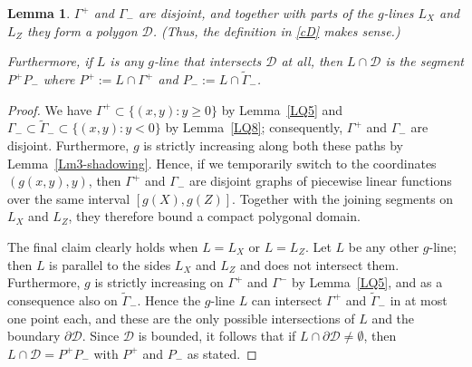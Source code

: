 \documentclass[11pt,reqno,tbtags,a4paper]{amsart}
\numberwithin{equation}{section}
\renewcommand\ge{\geq}
\renewcommand\geq{\geqslant}
\theoremstyle{plain}%
\newtheorem{lemma}[theorem]{Lemma}
\theoremstyle{definition}
\theoremstyle{remark}
\newcommand{\refL}[1]{Lemma~\ref{#1}}
\newcommand\set[1]{\ensuremath{\{#1\}}}
\newcommand\gG{\Gamma}
\newcommand\cD{\mathcal D}
\newcommand\tgG{\widetilde{\gG}}
\newcommand\0{{\boldsymbol 0}}
\newcommand\1{{\boldsymbol 1}}
\begin{document}
\begin{lemma}\label{LQ9}
  $\gG^+$ and $\gG_-$ are disjoint, and together with parts of 
the $g$-lines $L_X$ and  $L_Z$ they form a polygon $\cD$.
(Thus, the definition in \eqref{cD} makes sense.)

Furthermore,
if $L$ is any $g$-line that intersects $\cD$ at all, then
$L\cap\cD$ is the segment $P^+P_-$ where 
$P^+:=L\cap\gG^+$ and
$P_-:=L\cap\tgG_-$. 
\end{lemma}
\begin{proof}
We have $\gG^+\subset\set{(x,y):y\ge0}$ by \refL{LQ5} 
and $\gG_-\subset\tgG_-\subset\set{(x,y):y<0}$ by \refL{LQ8};
consequently, $\gG^+$ and $\gG_-$ are disjoint.
%
Furthermore, 
$g$ is strictly increasing along both these paths 
by \refL{Lm3-shadowing}.
Hence, 
if we temporarily switch to the coordinates $(g(x,y),y)$, then
$\gG^+$ and $\gG_-$
are disjoint graphs of 
piecewise linear
functions over the same interval $[g(X),g(Z)]$.
Together with the joining segments on $L_X$ and $L_Z$, they therefore
bound a compact polygonal domain. 
%

The final claim clearly holds when $L=L_X$ or $L=L_Z$.
Let $L$ be any other $g$-line; then $L$ is parallel to the sides $L_X$ and
$L_Z$ and does not intersect them.
Furthermore, $g$ is strictly increasing on $\gG^+$ and $\gG^-$ by \refL{LQ5},
and as a consequence  also on $\tgG_-$. Hence 
the $g$-line $L$ can intersect $\gG^+$ and $\tgG_-$ in at most one point each,
and these are the only possible intersections of $L$ and
the boundary $\partial\cD$.
Since $\cD$ is bounded, it follows that if $L\cap\partial\cD\neq\emptyset$,
then  $L\cap\cD=P^+P_-$ with $P^+$ and $P_-$ as stated.
\end{proof}
\end{document}

